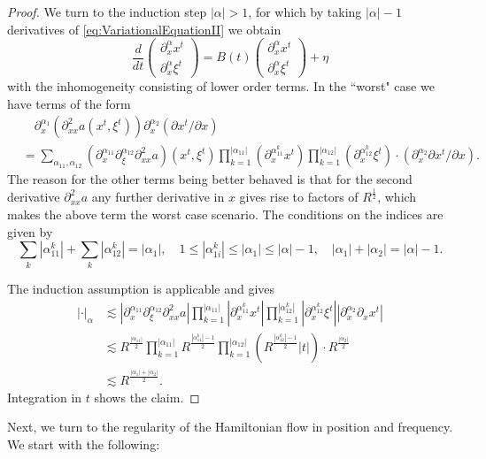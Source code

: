 \documentclass{amsart}
\theoremstyle{definition}
\begin{document}
\begin{proof}
We turn to the induction step $|\alpha| > 1$, for which by taking $|\alpha|-1$ derivatives of \eqref{eq:VariationalEquationII} we obtain
\begin{equation*}
\frac{d}{dt}
\begin{pmatrix}
\partial_x^{\alpha} x^t \\
\partial_x^{\alpha} \xi^t
\end{pmatrix}
= B(t)
\begin{pmatrix}
\partial_x^{\alpha} x^t \\
\partial_x^{\alpha} \xi^t
\end{pmatrix}
+ \eta
\end{equation*}
with the inhomogeneity consisting of lower order terms. In the ``worst" case we have terms of the form
\begin{equation*}
\begin{split}
&\quad \partial_x^{\alpha_1} (\partial^2_{xx} a(x^t,\xi^t)) \partial_x^{\alpha_2} (\partial x^t / \partial x) \\
&= \sum_{\alpha_{11},\alpha_{12}} (\partial_{x}^{\alpha_{11}} \partial_{\xi}^{\alpha_{12}} \partial^2_{xx} a)(x^t,\xi^t) \prod_{k=1}^{|\alpha_{11}|} (\partial_{x}^{\alpha_{11}^k} x^t) \prod_{k=1}^{|\alpha_{12}|} (\partial_x^{\alpha_{12}^k} \xi^t) \cdot( \partial_x^{\alpha_2} \partial x^t / \partial x).
\end{split}
\end{equation*}
The reason for the other terms being better behaved is that for the second derivative $\partial^2_{xx} a$ any further derivative in $x$ gives rise to factors of $R^{\frac{1}{2}}$, which makes the above term the worst case scenario. The conditions on the indices are given by
\begin{equation*}
\sum_k |\alpha_{11}^k| + \sum_k |\alpha_{12}^k| = |\alpha_1|, \quad 1 \leq |\alpha_{1i}^k| \leq |\alpha_1| \leq |\alpha| - 1, \quad |\alpha_1| + |\alpha_2| = |\alpha| - 1.
\end{equation*}

The induction assumption is applicable and gives
\begin{equation*}
\begin{split}
|\cdot|_{\alpha} &\lesssim |\partial_{x}^{\alpha_{11}} \partial_{\xi}^{\alpha_{12}} \partial^2_{xx} a| \prod_{k=1}^{|\alpha_{11}|} |\partial_x^{\alpha_{11}^k} x^t| \prod_{k=1}^{|\alpha_{12}^k|} |\partial_x^{\alpha_{12}^k} \xi^t| |\partial_x^{\alpha_2} \partial_x x^t| \\
&\lesssim R^{\frac{|\alpha_{11}|}{2}} \prod_{k=1}^{|\alpha_{11}|} R^{\frac{|\alpha_{11}^k| - 1}{2}} \prod_{k=1}^{|\alpha_{12}|} (R^{\frac{|\alpha_{12}^k| - 1}{2}} |t| ) \cdot R^{\frac{|\alpha_2|}{2}} \\
&\lesssim R^{\frac{|\alpha_1|+|\alpha_2|}{2}}.
\end{split}
\end{equation*}
Integration in $t$ shows the claim.
\end{proof}
Next, we turn to the regularity of the Hamiltonian flow in position and frequency. We start with the following:
\end{document}
